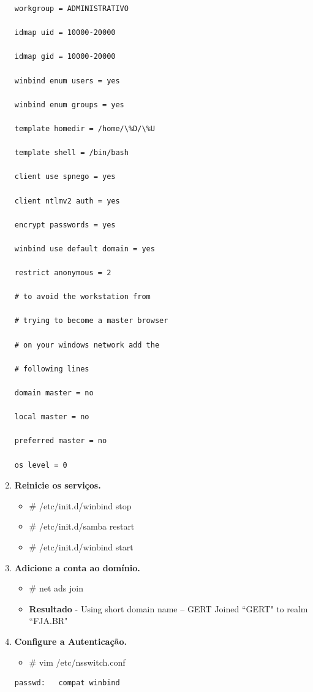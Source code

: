 \begin{enumerate}
\begin{lstlisting}
workgroup = ADMINISTRATIVO

idmap uid = 10000-20000

idmap gid = 10000-20000

winbind enum users = yes

winbind enum groups = yes

template homedir = /home/\%D/\%U

template shell = /bin/bash

client use spnego = yes

client ntlmv2 auth = yes

encrypt passwords = yes

winbind use default domain = yes

restrict anonymous = 2

# to avoid the workstation from

# trying to become a master browser

# on your windows network add the

# following lines

domain master = no

local master = no

preferred master = no

os level = 0
\end{lstlisting}

	\item \textbf{Reinicie os serviços.}
		\begin{itemize}
			\item \# /etc/init.d/winbind stop
			\item \# /etc/init.d/samba restart
			\item \# /etc/init.d/winbind start
		\end{itemize}

	\item \textbf{Adicione a conta ao domínio.}\\
		\begin{itemize}
			\item \# net ads join
		\end{itemize}
		\begin{itemize}
			\item \textbf{Resultado} - Using short domain name – GERT Joined ``GERT" to realm ``FJA.BR"
		\end{itemize}

	\item \textbf{Configure a Autenticação.}
		\begin{itemize}
				\item \# vim /etc/nsswitch.conf\\
		\end{itemize}
		\begin{lstlisting}
passwd:   compat winbind


\end{lstlisting}
\end{enumerate}
